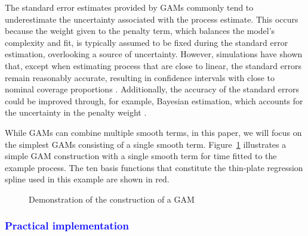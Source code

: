 \documentclass[man, floatsintext]{apa7}
\begin{document}
The standard error estimates provided by GAMs commonly tend to underestimate
the uncertainty associated with the process estimate. This occurs because the
weight given to the penalty term, which balances the model's complexity and
fit, is typically assumed to be fixed during the standard error estimation,
overlooking a source of uncertainty. However, simulations have shown that,
except when estimating process that are close to linear, the standard errors
remain reasonably accurate, resulting in confidence intervals with close to
nominal coverage proportions \parencite{marra_coverage_2012}. Additionally, the
accuracy of the standard errors could be improved through, for example,
Bayesian estimation, which accounts for the uncertainty in the penalty weight
\parencite{wood_generalized_2006}.

While GAMs can combine multiple smooth terms, in this paper, we will focus on
the simplest GAMs consisting of a single smooth term. Figure~\ref{fig:gam_dem}
illustrates a simple GAM construction with a single smooth term for time
fitted to the example process. The ten basis functions that constitute the
thin-plate regression spline used in this example are shown in red.

\begin{figure}[!t]
  \caption{Demonstration of the construction of a GAM}
  \label{fig:gam_dem}
\end{figure}

\subsubsection{\textcolor{blue}{Practical implementation}}
\end{document}
